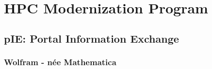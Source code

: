% 

\section{HPC Modernization Program}

\subsection{pIE: Portal Information Exchange}

\begin{frame}\frametitle{Wolfram - n\'{e}e Mathematica}
\center
\end{frame}
%

%

\endinput  %
